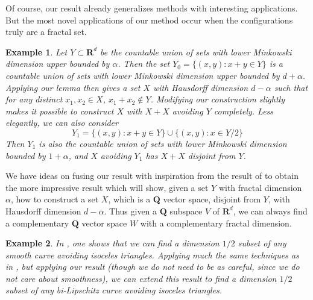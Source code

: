 \documentclass[usenames,dvipsnames]{article}
\theoremstyle{plain}
\newtheorem*{example}{Example}
\theoremstyle{plain}
\begin{document}
Of course, our result already generalizes methods with interesting applications. But the most novel applications of our method occur when the configurations truly are a fractal set.

\begin{example}
	Let $Y \subset \mathbf{R}^d$ be the countable union of sets with lower Minkowski dimension upper bounded by $\alpha$. Then the set $Y_0 = \{ (x,y): x + y \in Y \}$ is a countable union of sets with lower Minkowski dimension upper bounded by $d + \alpha$. Applying our lemma then gives a set $X$ with Hausdorff dimension $d - \alpha$ such that for any distinct $x_1, x_2 \in X$, $x_1 + x_2 \not \in Y$. Modifying our construction slightly makes it possible to construct $X$ with $X + X$ avoiding $Y$ completely. Less elegantly, we can also consider
	\[ Y_1 = \{ (x,y) : x + y \in Y \} \cup \{ (x,y): x \in Y/2 \} \]
	Then $Y_1$ is also the countable union of sets with lower Minkowski dimension bounded by $1 + \alpha$, and $X$ avoiding $Y_1$ has $X + X$ disjoint from $Y$.
\end{example}

We have ideas on fusing our result with inspiration from the result of \cite{Mathe} to obtain the more impressive result which will show, given a set $Y$ with fractal dimension $\alpha$, how to construct a set $X$, which is a $\mathbf{Q}$ vector space, disjoint from $Y$, with Hausdorff dimension $d - \alpha$. Thus given a $\mathbf{Q}$ subspace $V$ of $\mathbf{R}^d$, we can always find a complementary $\mathbf{Q}$ vector space $W$ with a complementary fractal dimension.

\begin{example}
	In \cite{MalabikaRob}, one shows that we can find a dimension $1/2$ subset of any smooth curve avoiding isoceles triangles. Applying much the same techniques as in \cite{MalabikaRob}, but applying our result (though we do not need to be as careful, since we do not care about smoothness), we can extend this result to find a dimension $1/2$ subset of any {\it bi-Lipschitz} curve avoiding isoceles triangles.
\end{example}
\end{document}
